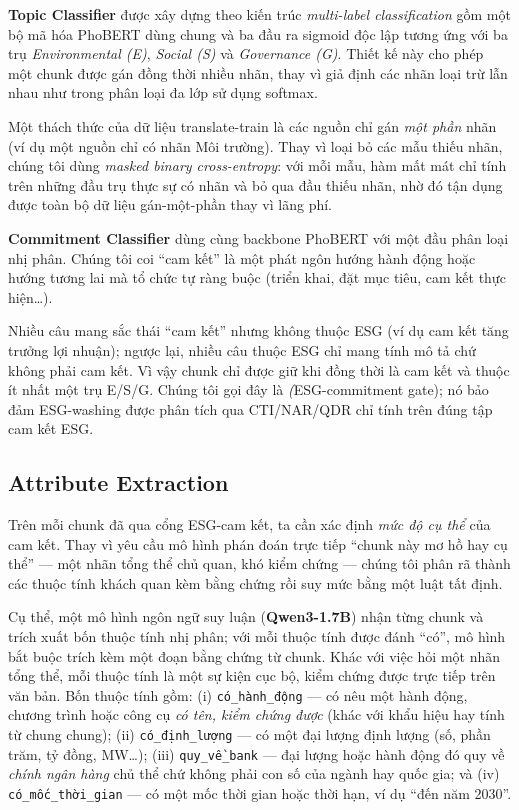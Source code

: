 \documentclass[runningheads]{llncs}
\begin{document}
\textbf{Topic Classifier} được xây dựng theo kiến trúc \emph{multi-label classification} gồm một bộ mã hóa PhoBERT dùng chung và ba đầu ra sigmoid độc lập tương ứng với ba trụ \emph{Environmental (E)}, \emph{Social (S)} và \emph{Governance (G)}. Thiết kế này cho phép một chunk được gán đồng thời nhiều nhãn, thay vì giả định các nhãn loại trừ lẫn nhau như trong phân loại đa lớp sử dụng softmax.

Một thách thức của dữ liệu translate-train là các nguồn chỉ gán \emph{một phần} nhãn (ví dụ một nguồn chỉ có nhãn Môi trường). Thay vì loại bỏ các mẫu thiếu nhãn, chúng tôi dùng \emph{masked binary cross-entropy}: với mỗi mẫu, hàm mất mát chỉ tính trên những đầu trụ thực sự có nhãn và bỏ qua đầu thiếu nhãn, nhờ đó tận dụng được toàn bộ dữ liệu gán-một-phần thay vì lãng phí.

\textbf{Commitment Classifier} dùng cùng backbone PhoBERT với một đầu phân loại nhị phân. Chúng tôi coi ``cam kết'' là một phát ngôn hướng hành động hoặc hướng tương lai mà tổ chức tự ràng buộc (triển khai, đặt mục tiêu, cam kết thực hiện\ldots).

Nhiều câu mang sắc thái ``cam kết'' nhưng không thuộc ESG (ví dụ cam kết tăng trưởng lợi nhuận); ngược lại, nhiều câu thuộc ESG chỉ mang tính mô tả chứ không phải cam kết. Vì vậy chunk chỉ được giữ khi đồng thời là cam kết và thuộc ít nhất một trụ E/S/G. Chúng tôi gọi đây là \emph(ESG-commitment gate); nó bảo đảm ESG-washing được phân tích qua CTI/NAR/QDR chỉ tính trên đúng tập cam kết ESG.


\subsection{Attribute Extraction}
\label{sec:attribute}
Trên mỗi chunk đã qua cổng ESG-cam kết, ta cần xác định \emph{mức độ cụ thể} của cam kết. Thay vì yêu cầu mô hình phán đoán trực tiếp ``chunk này mơ hồ hay cụ thể'' --- một nhãn tổng thể chủ quan, khó kiểm chứng --- chúng tôi phân rã thành các thuộc tính khách quan kèm bằng chứng rồi suy mức bằng một luật tất định.

Cụ thể, một mô hình ngôn ngữ suy luận (\textbf{Qwen3-1.7B}) nhận từng chunk và trích xuất bốn thuộc tính nhị phân; với mỗi thuộc tính được đánh ``có'', mô hình bắt buộc trích kèm một đoạn bằng chứng từ chunk. Khác với việc hỏi một nhãn tổng thể, mỗi thuộc tính là một sự kiện cục bộ, kiểm chứng được trực tiếp trên văn bản. Bốn thuộc tính gồm: (i) \texttt{có\_hành\_động} --- có nêu một hành động, chương trình hoặc công cụ \emph{có tên, kiểm chứng được} (khác với khẩu hiệu hay tính từ chung chung); (ii) \texttt{có\_định\_lượng} --- có một đại lượng định lượng (số, phần trăm, tỷ đồng, MW\ldots); (iii) \texttt{quy\_về\_bank} --- đại lượng hoặc hành động đó quy về \emph{chính ngân hàng} chủ thể chứ không phải con số của ngành hay quốc gia; và (iv) \texttt{có\_mốc\_thời\_gian} --- có một mốc thời gian hoặc thời hạn, ví dụ ``đến năm 2030''.
\end{document}

